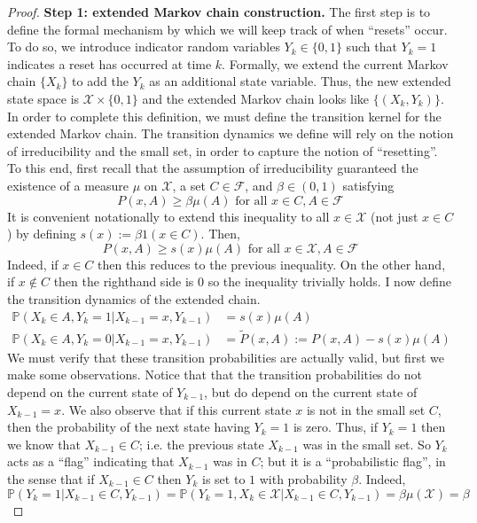 \documentclass[12pt]{article}
\newcommand{\Prob}{\mathbb{P}}
\begin{document}
\begin{proof} 
\noindent
\textbf{Step 1: extended Markov chain construction.} The first step is to define the formal mechanism by which we will keep track of when ``resets'' occur. To do so, we introduce 
indicator random variables $Y_k \in \{0, 1\}$ such that $Y_k = 1$ indicates a reset has occurred at time $k$. Formally, we extend the current Markov chain $\{X_k\}$ to add the $Y_k$ as an 
additional state variable. Thus, the new extended state space is $\mathcal{X} \times \{0, 1\}$ and the extended Markov chain looks like $\{(X_k, Y_k)\}$. In order to complete this definition, we 
must define the transition kernel for the extended Markov chain. The transition dynamics we define will rely on the notion of irreducibility and the small set, in order to capture the notion of 
``resetting''. To this end, first recall that the assumption of irreducibility guaranteed the existence of a measure $\mu$ on $\mathcal{X}$, a set $C \in \mathcal{F}$, and 
$\beta \in (0, 1)$ satisfying 
\[P(x, A) \geq \beta \mu(A) \text{ for all } x \in C, A \in \mathcal{F} \]
It is convenient notationally to extend this inequality to all $x \in \mathcal{X}$ (not just $x \in C$) by defining $s(x) := \beta 1(x \in C)$. Then, 
\[P(x, A) \geq s(x)\mu(A) \text{ for all } x \in \mathcal{X}, A \in \mathcal{F} \]
Indeed, if $x \in C$ then this reduces to the previous inequality. On the other hand, if $x \notin C$ then the righthand side is $0$ so the inequality trivially holds. I now define the transition dynamics 
of the extended chain. 
\begin{align*}
\Prob(X_k \in A, Y_k = 1|X_{k-1} = x, Y_{k-1}) &= s(x)\mu(A) \\
\Prob(X_k \in A, Y_k = 0|X_{k-1} = x, Y_{k-1}) &= \tilde{P}(x, A) := P(x, A) - s(x) \mu(A) 
\end{align*} 
We must verify that these transition probabilities are actually valid, but first we make some observations. Notice that that the transition probabilities do not depend on the current 
state of $Y_{k-1}$, but do depend on the current state of $X_{k-1} = x$. We also observe that if this current state $x$ is not in the small set $C$, then the probability of the next state having 
$Y_{k} = 1$ is zero. Thus, if $Y_{k} = 1$ then we know that $X_{k-1} \in C$; i.e. the previous state $X_{k-1}$ was in the small set. So $Y_{k}$ acts as a ``flag'' indicating that 
$X_{k-1}$ was in $C$; but it is a ``probabilistic flag'', in the sense that if $X_{k-1} \in C$ then $Y_k$ is set to $1$ with probability $\beta$. Indeed, 
\[\Prob(Y_k = 1|X_{k-1} \in C, Y_{k-1}) = \Prob(Y_k = 1, X_k \in \mathcal{X}|X_{k-1} \in C, Y_{k-1}) = \beta \mu(\mathcal{X}) = \beta\]

\end{proof}
\end{document}
